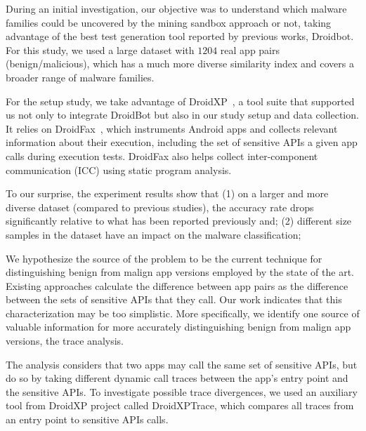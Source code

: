 During an initial investigation, our objective was to understand which malware families could be uncovered by the mining sandbox approach or not, taking advantage of the best test generation tool reported by previous works, Droidbot. For this study, we used a large dataset with $1204$ real app pairs (benign/malicious), which has a much more diverse similarity index and covers a broader range of malware families.

For the setup study, we take advantage of DroidXP~\cite{DBLP:conf/scam/CostaMCMVBC20}, a tool suite that supported us not only to integrate DroidBot but also in our study setup and data collection. It relies on DroidFax~\cite{DBLP:conf/icsm/CaiR17a}, which instruments Android apps and collects relevant information about their execution, including the set of sensitive APIs a given app calls during execution tests. DroidFax also helps collect inter-component communication (ICC) using static program analysis.

To our surprise, the experiment results show that (1) on a larger and more diverse dataset (compared to previous studies),
the accuracy rate drops significantly relative to what has been reported previously and; (2) different size samples in the dataset have an impact on the malware classification;

We hypothesize the source of the problem to be the current technique for distinguishing benign from malign app versions employed by the state of the art. Existing approaches calculate the difference between app pairs as the difference between the sets of sensitive APIs 
that they call. Our work indicates that this characterization may be too simplistic. More specifically, we identify one 
source of valuable information for more accurately
distinguishing benign from malign app versions, the trace analysis. 

The analysis considers that two apps may call the same set of sensitive APIs, but do so by taking different dynamic call traces between the app's entry point and the sensitive APIs. To investigate possible trace divergences, we used an auxiliary tool from DroidXP project called DroidXPTrace, which compares all traces from an entry point to sensitive APIs calls.


